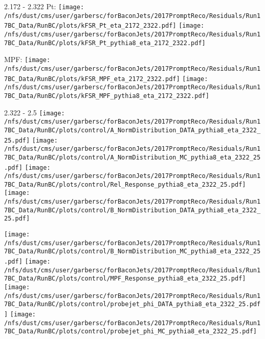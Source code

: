 \documentclass[t,compress]{beamer}
\begin{document}
\begin{frame}{2.172 - 2.322}
	 Pt: \texttt{[image: /nfs/dust/cms/user/garbersc/forBaconJets/2017PromptReco/Residuals/Run17BC\_Data/RunBC/plots/kFSR\_Pt\_eta\_2172\_2322.pdf]}
	\texttt{[image: /nfs/dust/cms/user/garbersc/forBaconJets/2017PromptReco/Residuals/Run17BC\_Data/RunBC/plots/kFSR\_Pt\_pythia8\_eta\_2172\_2322.pdf]}
\newline

	 MPF: \texttt{[image: /nfs/dust/cms/user/garbersc/forBaconJets/2017PromptReco/Residuals/Run17BC\_Data/RunBC/plots/kFSR\_MPF\_eta\_2172\_2322.pdf]}
	\texttt{[image: /nfs/dust/cms/user/garbersc/forBaconJets/2017PromptReco/Residuals/Run17BC\_Data/RunBC/plots/kFSR\_MPF\_pythia8\_eta\_2172\_2322.pdf]}
\end{frame}

\begin{frame}{2.322 - 2.5}
	\texttt{[image: /nfs/dust/cms/user/garbersc/forBaconJets/2017PromptReco/Residuals/Run17BC\_Data/RunBC/plots/control/A\_NormDistribution\_DATA\_pythia8\_eta\_2322\_25.pdf]}
	\texttt{[image: /nfs/dust/cms/user/garbersc/forBaconJets/2017PromptReco/Residuals/Run17BC\_Data/RunBC/plots/control/A\_NormDistribution\_MC\_pythia8\_eta\_2322\_25.pdf]}
	\texttt{[image: /nfs/dust/cms/user/garbersc/forBaconJets/2017PromptReco/Residuals/Run17BC\_Data/RunBC/plots/control/Rel\_Response\_pythia8\_eta\_2322\_25.pdf]}
	\texttt{[image: /nfs/dust/cms/user/garbersc/forBaconJets/2017PromptReco/Residuals/Run17BC\_Data/RunBC/plots/control/B\_NormDistribution\_DATA\_pythia8\_eta\_2322\_25.pdf]}
\newline

	\texttt{[image: /nfs/dust/cms/user/garbersc/forBaconJets/2017PromptReco/Residuals/Run17BC\_Data/RunBC/plots/control/B\_NormDistribution\_MC\_pythia8\_eta\_2322\_25.pdf]}
	\texttt{[image: /nfs/dust/cms/user/garbersc/forBaconJets/2017PromptReco/Residuals/Run17BC\_Data/RunBC/plots/control/MPF\_Response\_pythia8\_eta\_2322\_25.pdf]}
	\texttt{[image: /nfs/dust/cms/user/garbersc/forBaconJets/2017PromptReco/Residuals/Run17BC\_Data/RunBC/plots/control/probejet\_phi\_DATA\_pythia8\_eta\_2322\_25.pdf]}
	\texttt{[image: /nfs/dust/cms/user/garbersc/forBaconJets/2017PromptReco/Residuals/Run17BC\_Data/RunBC/plots/control/probejet\_phi\_MC\_pythia8\_eta\_2322\_25.pdf]}
\end{frame}
\end{document}
